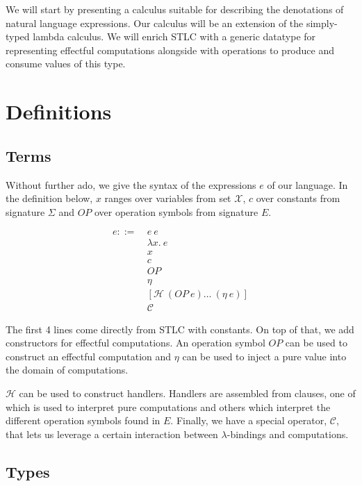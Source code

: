 We will start by presenting a calculus suitable for describing the
denotations of natural language expressions. Our calculus will be an
extension of the simply-typed lambda calculus. We will enrich STLC with a
generic datatype for representing effectful computations alongside with
operations to produce and consume values of this type.

\chapter{Definitions}

\section{Terms}

Without further ado, we give the syntax of the expressions $e$ of our
language. In the definition below, $x$ ranges over variables from set
$\mathcal{X}$, $c$ over constants from signature $\Sigma$ and $OP$ over
operation symbols from signature $E$.

\begin{align*}
  e ::= \
  & e\ e \\
  & \lambda x.\ e \\
  & x \\
  & c \\
  & OP \\
  & \eta \\
  & \left[\mathcal{H}\ (OP\ e) \ldots\ (\eta\ e)\right]\\
  & \mathcal{C}
\end{align*}

The first 4 lines come directly from STLC with constants. On top of that,
we add constructors for effectful computations. An operation symbol $OP$
can be used to construct an effectful computation and $\eta$ can be used to
inject a pure value into the domain of computations.

$\mathcal{H}$ can be used to construct handlers. Handlers are assembled
from clauses, one of which is used to interpret pure computations and
others which interpret the different operation symbols found in
$E$. Finally, we have a special operator, $\mathcal{C}$, that lets us
leverage a certain interaction between $\lambda$-bindings and computations.


\section{Types}

